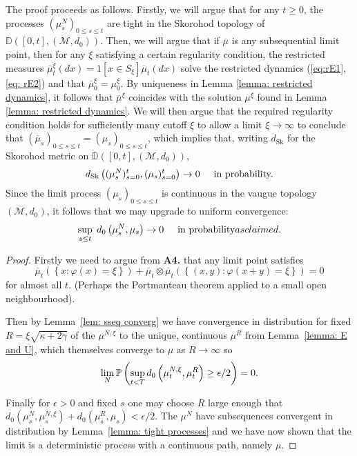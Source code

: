 \begin{remark}
\end{remark} The proof proceeds as follows. Firstly, we will argue that for any $t\ge 0$, the processes $(\mu^N_s)_{0\le s\le t}$ are tight in the Skorohod topology of $\mathbb{D}([0,t],(\mathcal{M},d_0))$.  Then, we will argue that if $\overline{\mu}$ is any subsequential limit point, then for any $\xi$ satisfying a certain regularity condition, the restricted measures $\overline{\mu}_t^\xi(dx)=1[x\in S_\xi]\overline{\mu}_t(dx)$ solve the restricted dynamics (\ref{eq:rE1}, \ref{eq: rE2}) and that $\overline{\mu}^\xi_0=\mu^\xi_0$. By uniqueness in Lemma \ref{lemma: restricted dynamics}, it follows that $\overline{\mu}^\xi$ coincides with the solution $\mu^\xi$ found in Lemma \ref{lemma: restricted dynamics}. We will then argue that the required regularity condition holds for sufficiently many cutoff $\xi$ to allow a limit $\xi \rightarrow \infty$ to conclude that $(\overline{\mu}_s)_{0\le s\le t}=(\mu_s)_{0\le s\le t}$, which implies that, writing $d_\mathrm{Sk}$ for the Skorohod metric on $\mathbb{D}([0,t],(\mathcal{M},d_0))$,  \begin{equation} d_\mathrm{Sk}\left((\mu^N_s)_{s=0}^t, (\mu_s)_{s=0}^t\right) \rightarrow 0 \hspace{0.5cm} \text{in probability.} \end{equation} Since the limit process $(\mu_s)_{0\le s\le t}$ is continuous in the vaugue topology $(\mathcal{M},d_0)$, it follows that we may upgrade to uniform convergence: \begin{equation} \sup_{s\le t}\hspace{0.1cm}d_0\left(\mu^N_s, \mu_s\right) \rightarrow 0 \hspace{0.5cm} \text{in probability} as claimed. \end{equation}
\begin{proof}
Firstly we need to argue from \textbf{A4.} that any limit point satisfies
\begin{equation*}
    \overline{\mu}_t\left(\left\{x\colon \varphi(x) = \xi\right\}\right) + 
    \overline{\mu}_t \otimes \overline{\mu}_t \left(\left\{(x,y) \colon \varphi(x+y) = \xi\right\}\right) = 0
\end{equation*}
for almost all $t$.  (Perhaps the Portmanteau theorem applied to a small open neighbourhood).

Then by Lemma~\ref{lem: sseq converg} we have convergence in distribution for fixed $R = \xi \sqrt{\kappa + 2\gamma}$ of the $\mu^{N,\xi}$ to the unique, continuous $\mu^R$ from Lemma~\ref{lemma: E and U}, which themselves converge to $\mu$ as $R\rightarrow \infty$ so
\begin{equation*}
    \lim_N \mathbb{P}\left(\sup_{t<T} d_0\left(\mu^{N,\xi}_t,\mu^R_t\right) \geq \epsilon/2 \right) = 0.
\end{equation*}

Finally for $\epsilon> 0$ and fixed $s$ one may choose $R$ large enough that $d_0\left(\mu_s^N,\mu_s^{N,\xi}\right) +d_0\left(\mu_s^R,\mu_s\right) < \epsilon / 2$.
The $\mu^N$ have subsequences convergent in distribution by Lemma~\ref{lemma: tight processes} and we have now shown that the limit is a deterministic process with a continuous path, namely $\mu$.
\end{proof}
